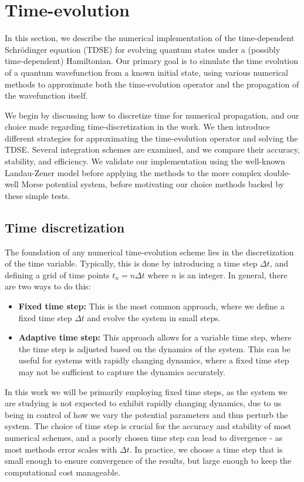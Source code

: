 \documentclass{subfiles}
\begin{document}
\section{Time-evolution}\label{sec:time_evolve_methods}
In this section, we describe the numerical implementation of the time-dependent Schrödinger equation (TDSE) for evolving quantum states under a (possibly time-dependent) Hamiltonian. Our primary goal is to simulate the time evolution of a quantum wavefunction from a known initial state, using various numerical methods to approximate both the time-evolution operator and the propagation of the wavefunction itself.

We begin by discussing how to discretize time for numerical propagation, and our choice made regarding time-discretization in the work. We then introduce different strategies for approximating the time-evolution operator and solving the TDSE. Several integration schemes are examined, and we compare their accuracy, stability, and efficiency. We validate our implementation using the well-known Landau-Zener model before applying the methods to the more complex double-well Morse potential system, before motivating our choice methods backed by these simple tests.

\subsection{Time discretization}
The foundation of any numerical time-evolution scheme lies in the discretization of the time variable. Typically, this is done by introducing a time step $\Delta t$, and defining a grid of time points $t_n = n \Delta t$ where $n$ is an integer. In general, there are two ways to do this:
\begin{itemize}
    \item \textbf{Fixed time step:} This is the most common approach, where we define a fixed time step $\Delta t$ and evolve the system in small steps. 
    \item \textbf{Adaptive time step:} This approach allows for a variable time step, where the time step is adjusted based on the dynamics of the system. This can be useful for systems with rapidly changing dynamics, where a fixed time step may not be sufficient to capture the dynamics accurately.
\end{itemize}
In this work we will be primarily employing fixed time steps, as the system we are studying is not expected to exhibit rapidly changing dynamics, due to us being in control of how we vary the potential parameters and thus perturb the system. The choice of time step is crucial for the accuracy and stability of most numerical schemes, and a poorly chosen time step can lead to divergence - as most methods error scales with $\Delta t$. In practice, we choose a time step that is small enough to ensure convergence of the results, but large enough to keep the computational cost manageable. 
\end{document}
